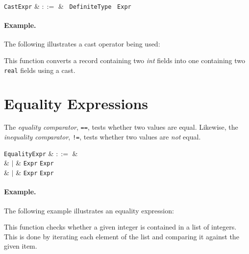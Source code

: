 \begin{syntax}
\verb+CastExpr+ & $::=$ & \token{(}\ \verb+DefiniteType+ \token{)}\ \verb+Expr+\\
\end{syntax}

\paragraph{Example.}  The following illustrates a cast operator being used:



This function converts a record containing two {\em int} fields into one containing two \lstinline{real} fields using a cast.


\section{Equality Expressions}
\label{c_expr_equality}
The {\em equality comparator}, \lstinline{==}, tests whether two values are equal.  Likewise, the {\em inequality comparator}, \lstinline{!=}, tests whether two values are {\em not} equal.

\begin{syntax}
  \verb+EqualityExpr+ & $::=$ &\\
  & $|$ & \verb+Expr+ \token{==} \verb+Expr+\\
  & $|$ & \verb+Expr+ \token{!=} \verb+Expr+\\
\end{syntax}

\paragraph{Example.}

The following example illustrates an equality expression:



This function checks whether a given integer is contained in a list of integers.  This is done by iterating each element of the list and comparing it against the given item.


